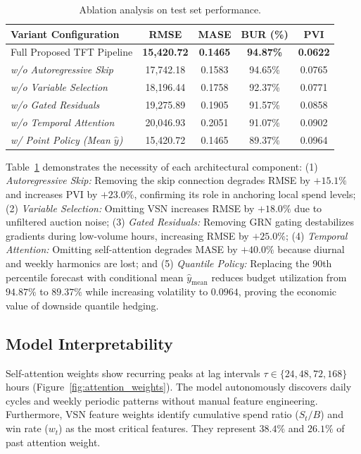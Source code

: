 \documentclass[sigconf]{acmart}
\begin{document}
\begin{table}[htbp]
  \centering
  \caption{Ablation analysis on test set performance.}
  \label{tab:ablation}
  \small
  \setlength{\tabcolsep}{3.5pt}
  \begin{tabular}{lcccc}
    \toprule
    \textbf{Variant Configuration} & \textbf{RMSE} & \textbf{MASE} & \textbf{BUR (\%)} & \textbf{PVI} \\
    \midrule
    Full Proposed TFT Pipeline & \textbf{15,420.72} & \textbf{0.1465} & \textbf{94.87\%} & \textbf{0.0622} \\
    \quad \emph{w/o Autoregressive Skip} & 17,742.18 & 0.1583 & 94.65\% & 0.0765 \\
    \quad \emph{w/o Variable Selection} & 18,196.44 & 0.1758 & 92.37\% & 0.0771 \\
    \quad \emph{w/o Gated Residuals} & 19,275.89 & 0.1905 & 91.57\% & 0.0858 \\
    \quad \emph{w/o Temporal Attention} & 20,046.93 & 0.2051 & 91.07\% & 0.0902 \\
    \quad \emph{w/ Point Policy (Mean $\hat{y}$)} & 15,420.72 & 0.1465 & 89.37\% & 0.0964 \\
    \bottomrule
  \end{tabular}
\end{table}

Table~\ref{tab:ablation} demonstrates the necessity of each architectural component: (1) \emph{Autoregressive Skip:} Removing the skip connection degrades RMSE by $+15.1\%$ and increases PVI by $+23.0\%$, confirming its role in anchoring local spend levels; (2) \emph{Variable Selection:} Omitting VSN increases RMSE by $+18.0\%$ due to unfiltered auction noise; (3) \emph{Gated Residuals:} Removing GRN gating destabilizes gradients during low-volume hours, increasing RMSE by $+25.0\%$; (4) \emph{Temporal Attention:} Omitting self-attention degrades MASE by $+40.0\%$ because diurnal and weekly harmonics are lost; and (5) \emph{Quantile Policy:} Replacing the 90th percentile forecast with conditional mean $\hat{y}_{\text{mean}}$ reduces budget utilization from $94.87\%$ to $89.37\%$ while increasing volatility to $0.0964$, proving the economic value of downside quantile hedging.

\subsection{Model Interpretability}
Self-attention weights show recurring peaks at lag intervals $\tau \in \{24, 48, 72, 168\}$ hours (Figure~\ref{fig:attention_weights}). The model autonomously discovers daily cycles and weekly periodic patterns without manual feature engineering. Furthermore, VSN feature weights identify cumulative spend ratio ($S_t / B$) and win rate ($w_t$) as the most critical features. They represent $38.4\%$ and $26.1\%$ of past attention weight.
\end{document}
